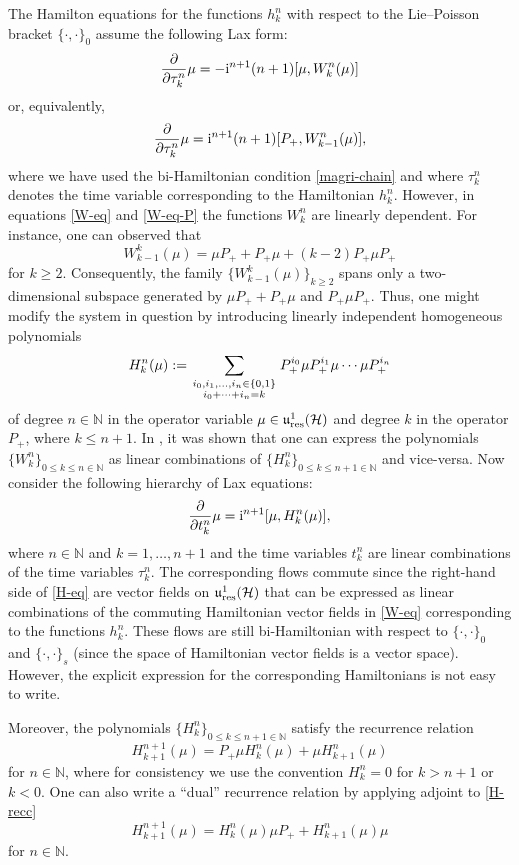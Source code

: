 \documentclass[pdftex]{sigma}
\theoremstyle{definition}
\numberwithin{equation}{section}
\newcommand{\N}{\mathbb N}
\renewcommand{\H}{\mathcal{H}}
\newcommand{\urp}{\mathfrak u_{\textnormal{res}}^1(\H)}
\newcommand{\pb}{\{\cdot,\cdot\}}
\newcommand{\be}{\begin{equation}}
\newcommand{\ee}{\end{equation}}
\begin{document}
The Hamilton equations for the functions $h_k^n$ with respect to the Lie--Poisson bracket $\pb_0$ assume the following Lax form:
\be \label{W-eq}\frac{\partial}{\partial\tau_k^n} \mu = - {\rm i}^{n+1}(n+1) [\mu, W_k^n(\mu)] \ee
or, equivalently,
\be \label{W-eq-P}\frac{\partial}{\partial\tau_k^n} \mu = {\rm i}^{n+1}(n+1) [P_+, W_{k-1}^n(\mu)],\ee
where we have used the bi-Hamiltonian condition \eqref{magri-chain} and where $\tau_k^n$ denotes the time variable corresponding to the Hamiltonian $h^n_k$.
However, in equations \eqref{W-eq} and \eqref{W-eq-P} the functions $W^n_k$ are linearly dependent. For instance, one can observed that \[
W^k_{k-1}(\mu) = \mu P_+ + P_+ \mu + (k-2)P_+\mu P_+
\] for $k\geq 2$. Consequently, the family $\bigl\{W^k_{k-1}(\mu)\bigr\}_{k\geq 2}$ spans only a two-dimensional subspace generated by $\mu P_+ + P_+\mu$ and $P_+\mu P_+$. Thus, one might modify the system in question by introducing linearly independent homogeneous polynomials
\be \label{Hnk} H_k^n(\mu):= \sum_{
\genfrac{}{}{0pt}1{i_0,i_1,\dots, i_n\in\{0,1\}}{i_0+\dots +i_n=k}
} P_+^{i_0}\mu P_+^{i_1}\mu\cdots \mu P_+^{i_n}\ee
of degree $n\in\N$ in the operator variable $\mu\in \urp$ and degree $k$ in the operator $P_+$, where $k\leq n+1$.
In \cite[Proposition~3.1]{GO-grass}, it was shown that one can express the polynomials $\{W^n_k\}_{0\leq k\leq n\in\N } $ as linear combinations of $\{H_k^n\}_{0\leq k\leq n+1\in\N }$ and vice-versa.
Now consider the following hierarchy of Lax equations:
\be \label{H-eq}\frac\partial{\partial t_k^n}\mu = {\rm i}^{n+1} [\mu, H_k^n(\mu)],\ee
where $n\in\N$ and $k=1,\dots, n+1$ and the time variables $t^n_k$ are linear combinations of the time variables $\tau^n_k$. The corresponding flows commute since the right-hand side of \eqref{H-eq} are vector fields on $\urp$ that can be expressed as linear combinations of the commuting Hamiltonian vector fields in \eqref{W-eq} corresponding to the functions $h^n_k$. These flows are still bi-Hamiltonian with respect to $\pb_0$ and $\pb_s$ (since the space of Hamiltonian vector fields is a vector space). However, the explicit expression for the corresponding Hamiltonians is not easy to write.

Moreover, the polynomials $\{H_k^n\}_{0\leq k\leq n+1\in\N }$ satisfy the recurrence relation
\be \label{H-recc} H^{n+1}_{k+1}(\mu)=P_+\mu H_k^n(\mu)+\mu H^n_{k+1}(\mu)\ee
for $n\in \N$, where for consistency we use the convention $H^n_k=0$ for $k>n+1$ or $k<0$.
One can also write a ``dual'' recurrence relation by applying adjoint to \eqref{H-recc}
\be\label{H-recc-dual} H^{n+1}_{k+1}(\mu)=H_k^n(\mu)\mu P_+ +H^n_{k+1}(\mu)\mu \ee
for $n\in \N$.
\end{document}
